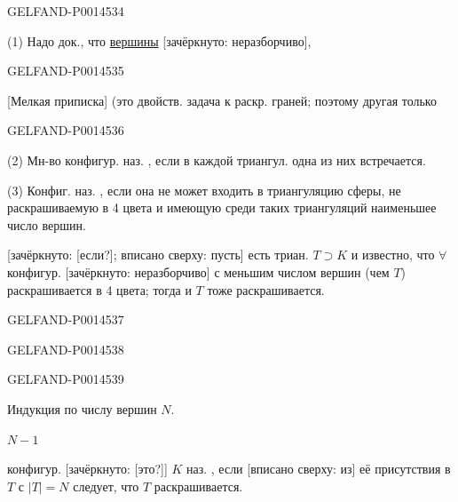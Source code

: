 \begin{GelfandAdjacentEvidence}{GELFAND-P001453}{4}


(1) Надо док., что \uline{вершины} 
[зачёркнуто: неразборчиво],
\end{GelfandAdjacentEvidence}
\begin{GelfandAdjacentEvidence}{GELFAND-P001453}{5}


[Мелкая приписка] (это двойств. задача к раскр. граней; поэтому другая только
\end{GelfandAdjacentEvidence}
\begin{GelfandAdjacentEvidence}{GELFAND-P001453}{6}


(2) Мн-во конфигур. наз. , если в каждой триангул. одна из них встречается.

(3) Конфиг. наз. , если она не может входить в триангуляцию сферы, не раскрашиваемую в 4 цвета и имеющую среди таких триангуляций наименьшее число вершин.

[зачёркнуто: [если?]; вписано сверху: пусть] есть триан. \(T\supset K\) и известно, что
\(\forall\) конфигур. [зачёркнуто: неразборчиво]
с меньшим числом вершин (чем \(T\)) раскрашивается в 4 цвета; тогда и \(T\) тоже раскрашивается.
\end{GelfandAdjacentEvidence}
\begin{GelfandAdjacentEvidence}{GELFAND-P001453}{7}

\end{GelfandAdjacentEvidence}
\begin{GelfandAdjacentEvidence}{GELFAND-P001453}{8}

\end{GelfandAdjacentEvidence}
\begin{GelfandAdjacentEvidence}{GELFAND-P001453}{9}


Индукция по числу вершин \(N\).

 \(N-1\) 

конфигур. [зачёркнуто: [это?]] \(K\) наз. , если [вписано сверху: из] её присутствия в \(T\)
с \(|T|=N\) следует, что \(T\) раскрашивается.
\end{GelfandAdjacentEvidence}
